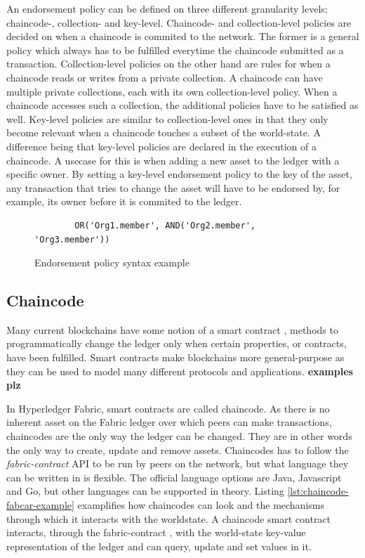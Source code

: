\documentclass[english, biblatex, digitaloutput]{kththesis}
\begin{document}
An endorsement policy can be defined on three different granularity levels; chaincode-, collection- and key-level. Chaincode- and collection-level policies are decided on when a chaincode is commited to the network. The former is a general policy which always has to be fulfilled everytime the chaincode submitted as a transaction. Collection-level policies on the other hand are rules for when a chaincode reads or writes from a private collection. A chaincode can have multiple private collections, each with its own collection-level policy. When a chaincode accesses such a collection, the additional policies have to be satisfied as well. Key-level policies are similar to collection-level ones in that they only become relevant when a chaincode touches a subset of the world-state. A difference being that key-level policies are declared in the execution of a chaincode. A usecase for this is when adding a new asset to the ledger with a specific owner. By setting a key-level endorsement policy to the key of the asset, any transaction that tries to change the asset will have to be endorsed by, for example, its owner before it is commited to the ledger.

\begin{figure}
	\begin{verbatim}
		OR('Org1.member', AND('Org2.member', 'Org3.member'))
	\end{verbatim}
	\caption{Endorsement policy syntax example}
	\label{fig:endorsement-policy-example}
\end{figure}

\subsection{Chaincode}

Many current blockchains have some notion of a smart contract \cite{di_pierro_what_2017}, \ie methods to programmatically change the ledger only when certain properties, or contracts, have been fulfilled. Smart contracts make blockchains more general-purpose as they can be used to model many different protocols and applications. \textbf{examples plz}

In Hyperledger Fabric, smart contracts are called chaincode. As there is no inherent asset on the Fabric ledger over which peers can make transactions, chaincodes are the only way the ledger can be changed. They are in other words the only way to create, update and remove assets. Chaincodes has to follow the \textit{fabric-contract} \gls{API} to be run by peers on the network, but what language they can be written in is flexible. The official language options are Java, Javascript and Go, but other languages can be supported in theory. Listing \ref{lst:chaincode-fabcar-example} examplifies how chaincodes can look and the mechanisms through which it interacts with the worldstate. A chaincode smart contract interacts, through the fabric-contract , with the world-state key-value representation of the ledger and can query, update and set values in it.
\end{document}
